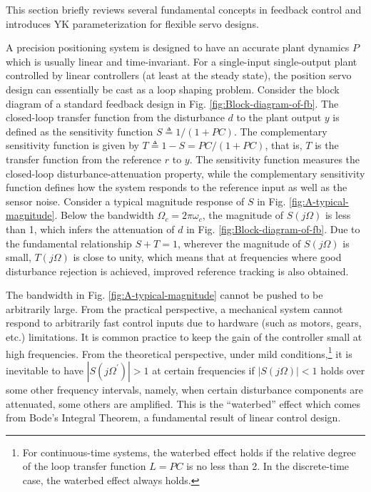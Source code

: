 \documentclass [11pt, proquest] {uwthesis}[2020/02/24]
\begin{document}
\label{sec:FB}This section briefly reviews several fundamental concepts
in feedback control and introduces YK parameterization for flexible
servo designs.

A precision positioning system is designed to have an accurate plant
dynamics $P$ which is usually linear and time-invariant. For a single-input
single-output plant controlled by linear controllers (at least at
the steady state), the position servo design can essentially be cast
as a loop shaping problem. Consider the block diagram of a standard
feedback design in Fig. \ref{fig:Block-diagram-of-fb}.
The closed-loop transfer function from the disturbance $d$ to
the plant output $y$ is defined as the sensitivity function $S\triangleq1/(1+PC)$.
The complementary sensitivity function is given by $T\triangleq1-S=PC/(1+PC)$,
that is, $T$ is the transfer function from the reference $r$ to
$y$. The sensitivity function measures the closed-loop disturbance-attenuation
property, while the complementary sensitivity function defines how
the system responds to the reference input as well as the sensor noise.
Consider a typical magnitude response of $S$ in Fig. \ref{fig:A-typical-magnitude}.
Below the bandwidth $\Omega_{c}=2\pi\omega_{c}$, the magnitude of
$S(j\Omega)$ is less than 1, which infers the attenuation of $d$
in Fig. \ref{fig:Block-diagram-of-fb}. Due to the fundamental
relationship $S+T=1$, wherever the magnitude of $S(j\Omega)$ is
small, $T(j\Omega)$ is close to unity, which means that at frequencies
where good disturbance rejection is achieved, improved reference tracking
is also obtained.

The bandwidth in Fig. \ref{fig:A-typical-magnitude} cannot be pushed
to be arbitrarily large. From the practical perspective, a mechanical
system cannot respond to arbitrarily fast control inputs due to hardware
(such as motors, gears, etc.) limitations. It is common practice to
keep the gain of the controller small at high frequencies. From the
theoretical perspective, under mild conditions,\footnote{For continuous-time systems, the waterbed effect holds if the relative
degree of the loop transfer function $L=PC$ is no less than 2. In
the discrete-time case, the waterbed effect always holds.} it is inevitable to have $|S(j\Omega^{'})|>1$ at certain frequencies
if $|S(j\Omega)|<1$ holds over some other frequency intervals, namely,
when certain disturbance components are attenuated, some others are
amplified. This is the ``waterbed'' effect which comes from Bode's
Integral Theorem, a fundamental result of linear control design. 
\end{document}
